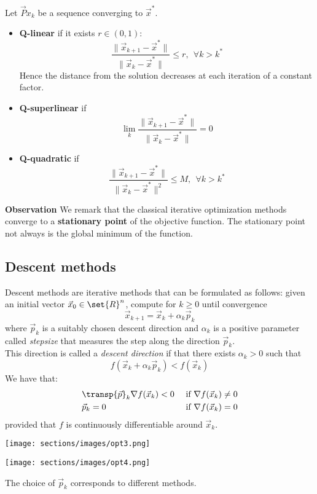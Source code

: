  Let $\vec P{x}_k$ be a sequence converging to $\vec{x}^*$.
\begin{itemize}
    \item \textbf{Q-linear} if it exists $r \in (0,1)$:
    $$\frac{\|\vec{x}_{k+1}-\vec{x}^*\|}{\|\vec{x}_{k}-\vec{x}^*\|} \leq r, \ \ \forall k > k^*$$
    Hence the distance from the solution decreases at each iteration of a constant factor.
    \item \textbf{Q-superlinear} if 
    $$\lim_k \frac{\|\vec{x}_{k+1}-\vec{x}^*\|}{\|\vec{x}_{k}-\vec{x}^*\|}=0$$
    \item \textbf{Q-quadratic}
    if $$\frac{\|\vec{x}_{k+1}-\vec{x}^*\|}{\|\vec{x}_{k}-\vec{x}^*\|^2} \leq M, \ \ \forall k > k^*$$
\end{itemize}

\textbf{Observation} We remark that the classical iterative optimization methods converge to a \textbf{stationary point} of the objective function. The stationary point not always is the global minimum of the function.


\subsection{Descent methods}
Descent methods are iterative methods that can be formulated as follows: given an initial vector $\vec{x}_0 \in \set{R}^n$, compute for $k \geq 0$ until convergence
$$ \vec{x}_{k+1} = \vec{x}_k + \alpha_k\vec{p}_k $$
where $\vec{p}_k$ is a suitably chosen descent direction and $\alpha_k$ is a positive parameter called \textit{stepsize} that measures the step along the direction $\vec{p}_k$. \\
This direction is called a \textit{descent direction} if   that there exists $\alpha_k > 0$ such that
$$ f(\vec{x}_k + \alpha_k\vec{p}_k) < f(\vec{x}_k) $$
We have that:
$$
    \begin{aligned}
        &\transp{\vec{p}}_k\nabla{f}(\vec{x}_k) < 0 &\text{ if } \nabla{f}(\vec{x}_k) \neq 0\\
        &\vec{p}_k = 0 &\text{ if } \nabla{f}(\vec{x}_k) = 0
    \end{aligned}
$$
provided that $f$ is continuously differentiable around $\vec{x}_k$.


\texttt{[image: sections/images/opt3.png]}

\texttt{[image: sections/images/opt4.png]}

The choice of $\vec{p}_k$ corresponds to different methods.

